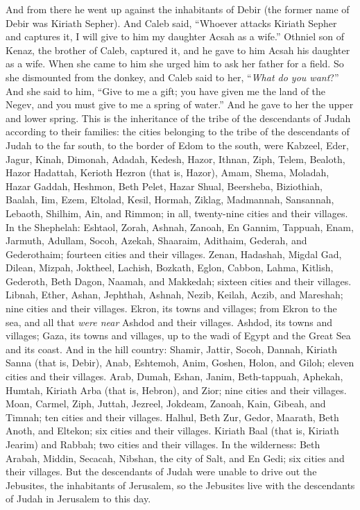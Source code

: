 \begin{biblechapter}
\verse And from there he went up against the inhabitants of Debir (the former name of Debir was Kiriath Sepher).
\verse And Caleb said, “Whoever attacks Kiriath Sepher and captures it, I will give to him my daughter Acsah as a wife.”
\verse Othniel son of Kenaz, the brother of Caleb, captured it, and he gave to him Acsah his daughter as a wife.
\verse When she came to him she urged him to ask her father for a field. So she dismounted from the donkey, and Caleb said to her, “\textit{What do you want}?”
\verse And she said to him, “Give to me a gift; you have given me the land of the Negev, and you must give to me a spring of water.” And he gave to her the upper and lower spring.
 This is the inheritance of the tribe of the descendants of Judah according to their families:
\verse the cities belonging to the tribe of the descendants of Judah to the far south, to the border of Edom to the south, were Kabzeel, Eder, Jagur,
\verse Kinah, Dimonah, Adadah,
\verse Kedesh, Hazor, Ithnan,
\verse Ziph, Telem, Bealoth,
\verse Hazor Hadattah, Kerioth Hezron (that is, Hazor),
\verse Amam, Shema, Moladah,
\verse Hazar Gaddah, Heshmon, Beth Pelet,
\verse Hazar Shual, Beersheba, Biziothiah,
\verse Baalah, Iim, Ezem,
\verse Eltolad, Kesil, Hormah,
\verse Ziklag, Madmannah, Sansannah,
\verse Lebaoth, Shilhim, Ain, and Rimmon; in all, twenty-nine cities and their villages.
\verse In the Shephelah: Eshtaol, Zorah, Ashnah,
\verse Zanoah, En Gannim, Tappuah, Enam,
\verse Jarmuth, Adullam, Socoh, Azekah,
\verse Shaaraim, Adithaim, Gederah, and Gederothaim; fourteen cities and their villages.
\verse Zenan, Hadashah, Migdal Gad,
\verse Dilean, Mizpah, Joktheel,
\verse Lachish, Bozkath, Eglon,
\verse Cabbon, Lahma, Kitlish,
\verse Gederoth, Beth Dagon, Naamah, and Makkedah; sixteen cities and their villages.
\verse Libnah, Ether, Ashan,
\verse Jephthah, Ashnah, Nezib,
\verse Keilah, Aczib, and Mareshah; nine cities and their villages.
\verse Ekron, its towns and villages;
\verse from Ekron to the sea, and all that \textit{were near} Ashdod and their villages.
\verse Ashdod, its towns and villages; Gaza, its towns and villages, up to the wadi of Egypt and the Great Sea and its coast.
\verse And in the hill country: Shamir, Jattir, Socoh,
\verse Dannah, Kiriath Sanna (that is, Debir),
\verse Anab, Eshtemoh, Anim,
\verse Goshen, Holon, and Giloh; eleven cities and their villages.
\verse Arab, Dumah, Eshan,
\verse Janim, Beth-tappuah, Aphekah,
\verse Humtah, Kiriath Arba (that is, Hebron), and Zior; nine cities and their villages.
\verse Moan, Carmel, Ziph, Juttah,
\verse Jezreel, Jokdeam, Zanoah,
\verse Kain, Gibeah, and Timnah; ten cities and their villages.
\verse Halhul, Beth Zur, Gedor,
\verse Maarath, Beth Anoth, and Eltekon; six cities and their villages.
\verse Kiriath Baal (that is, Kiriath Jearim) and Rabbah; two cities and their villages.
\verse In the wilderness: Beth Arabah, Middin, Secacah,
\verse Nibshan, the city of Salt, and En Gedi; six cities and their villages.
\verse But the descendants of Judah were unable to drive out the Jebusites, the inhabitants of Jerusalem, so the Jebusites live with the descendants of Judah in Jerusalem to this day.
\end{biblechapter}

